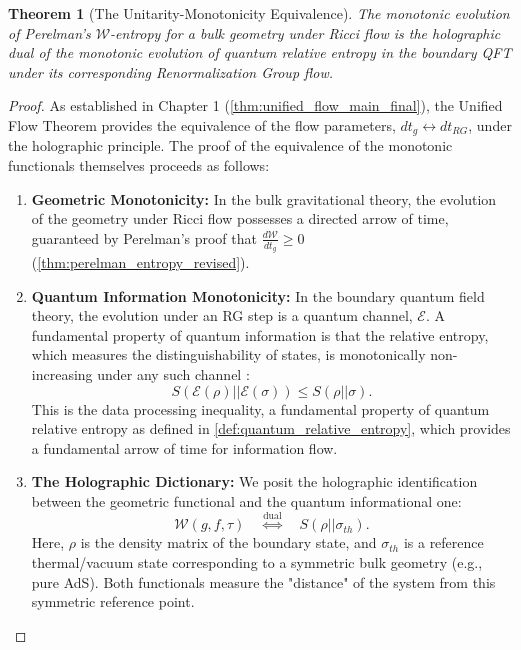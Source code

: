 \documentclass[11pt, letterpaper]{report}
\theoremstyle{plain} %
\newtheorem{theorem}{Theorem}[chapter]
\theoremstyle{definition} %
\theoremstyle{remark} %
\begin{document}
\begin{theorem}[The Unitarity-Monotonicity Equivalence]
\label{thm:unitarity_monotonicity_final}
The monotonic evolution of Perelman's $\mathcal{W}$-entropy for a bulk geometry under Ricci flow is the holographic dual of the monotonic evolution of quantum relative entropy in the boundary QFT under its corresponding Renormalization Group flow.
\end{theorem}
\begin{proof}
As established in Chapter 1 (\cref{thm:unified_flow_main_final}), the Unified Flow Theorem provides the equivalence of the flow parameters, $dt_g \leftrightarrow dt_{RG}$, under the holographic principle. The proof of the equivalence of the monotonic functionals themselves proceeds as follows:
\begin{enumerate}
    \item \textbf{Geometric Monotonicity:} In the bulk gravitational theory, the evolution of the geometry under Ricci flow possesses a directed arrow of time, guaranteed by Perelman's proof that $\frac{d\mathcal{W}}{dt_g} \ge 0$ (\cref{thm:perelman_entropy_revised}).

    \item \textbf{Quantum Information Monotonicity:} In the boundary quantum field theory, the evolution under an RG step is a quantum channel, $\mathcal{E}$. A fundamental property of quantum information is that the relative entropy, which measures the distinguishability of states, is monotonically non-increasing under any such channel \cite{Wehrl1978,NielsenChuang2010}:
    \begin{equation}
        S(\mathcal{E}(\rho) || \mathcal{E}(\sigma)) \le S(\rho || \sigma).
        \label{eq:relative_entropy_monotonicity_final}
    \end{equation}
    This is the data processing inequality, a fundamental property of quantum relative entropy as defined in \cref{def:quantum_relative_entropy}, which provides a fundamental arrow of time for information flow.

    \item \textbf{The Holographic Dictionary:} We posit the holographic identification between the geometric functional and the quantum informational one:
    \begin{equation}
        \mathcal{W}(g, f, \tau) \quad \overset{\text{dual}}{\Longleftrightarrow} \quad S(\rho || \sigma_{th}).
    \end{equation}
    Here, $\rho$ is the density matrix of the boundary state, and $\sigma_{th}$ is a reference thermal/vacuum state corresponding to a symmetric bulk geometry (e.g., pure AdS). Both functionals measure the "distance" of the system from this symmetric reference point.


\end{enumerate}
\end{proof}
\end{document}
